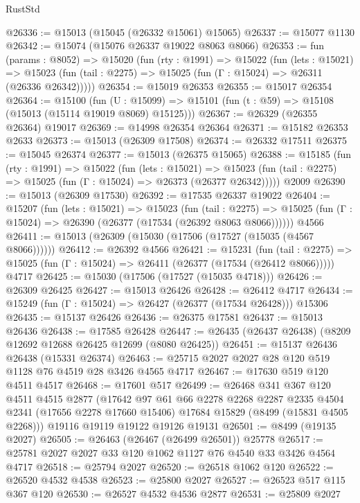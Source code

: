 \begin{lexlean}{RustStd}
\begin{coremodule}
@26336 := @15013 (@15045 (@26332 @15061) @15065)
@26337 := @15077 @1130
@26342 := @15074 (@15076 @26337 @19022 @8063 @8066)
@26353 := fun (params : @8052) =>
  @15020
    (fun (rty : @1991) =>
    @15022
      (fun (lets : @15021) =>
      @15023 (fun (tail : @2275) => @15025 (fun (Γ : @15024) => @26311 (@26336 @26342)))))
@26354 := @15019 @26353
@26355 := @15017 @26354
@26364 := @15100
    (fun (U : @15099) => @15101 (fun (t : @59) => @15108 (@15013 (@15114 @19019 @8069) @15125)))
@26367 := @26329 (@26355 @26364) @19017
@26369 := @14998 @26354 @26364
@26371 := @15182 @26353 @2633
@26373 := @15013 (@26309 @17508)
@26374 := @26332 @17511
@26375 := @15045 @26374
@26377 := @15013 (@26375 @15065)
@26388 := @15185
    (fun (rty : @1991) =>
    @15022
      (fun (lets : @15021) =>
      @15023 (fun (tail : @2275) => @15025 (fun (Γ : @15024) => @26373 (@26377 @26342)))))
    @2009
@26390 := @15013 (@26309 @17530)
@26392 := @17535 @26337 @19022
@26404 := @15207
    (fun (lets : @15021) =>
    @15023
      (fun (tail : @2275) =>
      @15025 (fun (Γ : @15024) => @26390 (@26377 (@17534 (@26392 @8063 @8066))))))
    @4566
@26411 := @15013 (@26309 (@15030 (@17506 (@17527 (@15035 (@4567 @8066))))))
@26412 := @26392 @4566
@26421 := @15231
    (fun (tail : @2275) => @15025 (fun (Γ : @15024) => @26411 (@26377 (@17534 (@26412 @8066)))))
    @4717
@26425 := @15030 (@17506 (@17527 (@15035 @4718)))
@26426 := @26309 @26425
@26427 := @15013 @26426
@26428 := @26412 @4717
@26434 := @15249 (fun (Γ : @15024) => @26427 (@26377 (@17534 @26428))) @15306
@26435 := @15137 @26426
@26436 := @26375 @17581
@26437 := @15013 @26436
@26438 := @17585 @26428
@26447 := @26435 (@26437 @26438) (@8209 @12692 @12688 @26425 @12699 (@8080 @26425))
@26451 := @15137 @26436 @26438 (@15331 @26374)
@26463 := @25715 @2027 @2027 @28 @120 @519 @1128 @76 @4519 @28 @3426 @4565 @4717
@26467 := @17630 @519 @120 @4511 @4517
@26468 := @17601 @517
@26499 := @26468
    @341
    @367
    @120
    @4511
    @4515
    @2877
    (@17642
      @97
      @61
      @66
      @2278
      @2268
      @2287
      @2335
      @4504
      @2341
      (@17656 @2278 @17660 @15406)
      @17684
      @15829
      (@8499 (@15831 @4505 @2268)))
    @19116
    @19119
    @19122
    @19126
    @19131
@26501 := @8499 (@19135 @2027)
@26505 := @26463 (@26467 (@26499 @26501)) @25778
@26517 := @25781 @2027 @2027 @33 @120 @1062 @1127 @76 @4540 @33 @3426 @4564 @4717
@26518 := @25794 @2027
@26520 := @26518 @1062 @120
@26522 := @26520 @4532 @4538
@26523 := @25800 @2027
@26527 := @26523 @517 @115 @367 @120
@26530 := @26527 @4532 @4536 @2877
@26531 := @25809 @2027

\end{coremodule}
\end{lexlean}
